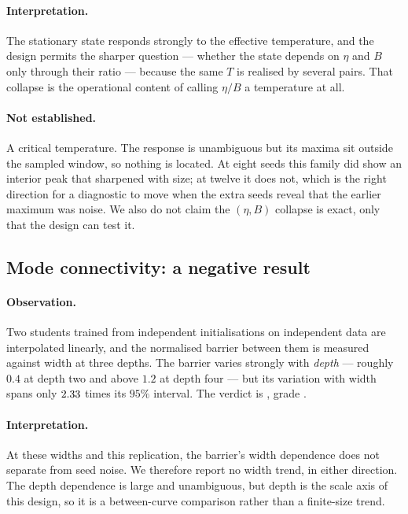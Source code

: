 \paragraph{Interpretation.}
The stationary state responds strongly to the effective temperature, and the
design permits the sharper question --- whether the state depends on
$\eta$ and $B$ only through their ratio --- because the same $T$ is realised by
several pairs. That collapse is the operational content of calling $\eta/B$ a
temperature at all.

\paragraph{Not established.}
A critical temperature. The response is unambiguous but its maxima sit outside
the sampled window, so nothing is located. At eight seeds this family did show
an interior peak that sharpened with size; at twelve it does not, which is the
right direction for a diagnostic to move when the extra seeds reveal that the
earlier maximum was noise. We also do not claim the $(\eta,B)$ collapse is
exact, only that the design can test it.

\subsection{Mode connectivity: a negative result}

\paragraph{Observation.}
Two students trained from independent initialisations on independent data are
interpolated linearly, and the normalised barrier between them is measured
against width at three depths. The barrier varies strongly with \emph{depth} ---
roughly $0.4$ at depth two and above $1.2$ at depth four --- but its variation
with width spans only $2.33{}$ times its $95\%$
interval. The verdict is \emph{\AtlasModeConnectivityVerdict{}}, grade
\AtlasModeConnectivityGrade{}.

\paragraph{Interpretation.}
At these widths and this replication, the barrier's width dependence does not
separate from seed noise. We therefore report no width trend, in either
direction. The depth dependence is large and unambiguous, but depth is the
scale axis of this design, so it is a between-curve comparison rather than a
finite-size trend.


